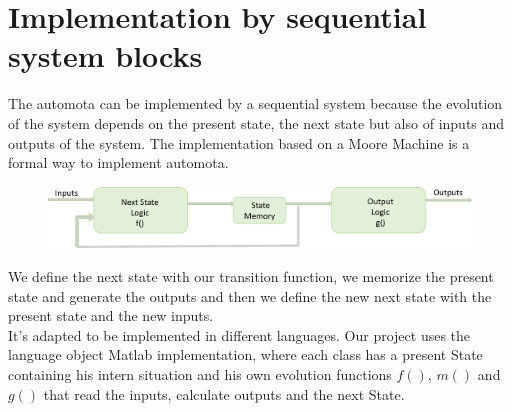  \section{Implementation by sequential system blocks}
 The automota can be implemented by a sequential system because the evolution of the system depends on the present state, the next state but also of inputs and outputs of the system. The implementation based on a Moore Machine is a formal way to implement automota. 
 \begin{figure}[!ht]
       \begin{center}
      \includegraphics[width = 18cm]{./IV/schema_FMG.pdf}
      \end{center}
  \end{figure}
  
 We define the next state with our transition function, we memorize the present state and generate the outputs and then we define the new next state with the present state and the new inputs.\\
 It's adapted to be implemented in different languages. Our project uses the language object Matlab implementation, where each class has a present State containing his intern situation and his own evolution functions $f()$, $m()$ and $g()$ that read the inputs, calculate outputs and the next State.






